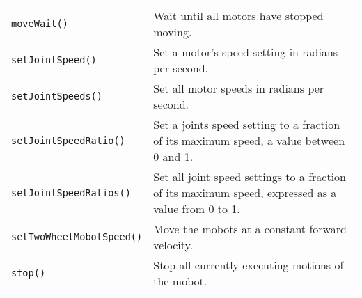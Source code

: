 \begin{tabular}{p{1.75in}p{4.5in}}
\texttt{moveWait()} & Wait until all motors have stopped moving. \\
\texttt{setJointSpeed()} & Set a motor's speed setting in radians per second. \\
\texttt{setJointSpeeds()} & Set all motor speeds in radians per second. \\
\texttt{setJointSpeedRatio()} & Set a joints speed setting to a fraction of its maximum speed, a value between 0 and 1. \\
\texttt{setJointSpeedRatios()} & Set all joint speed settings to a fraction of its
maximum speed, expressed as a value from 0 to 1. \\
\texttt{setTwoWheelMobotSpeed()} & Move the mobots at a constant forward velocity. \\
\texttt{stop()} & Stop all currently executing motions of the mobot. \\
\hline
\end{tabular}

